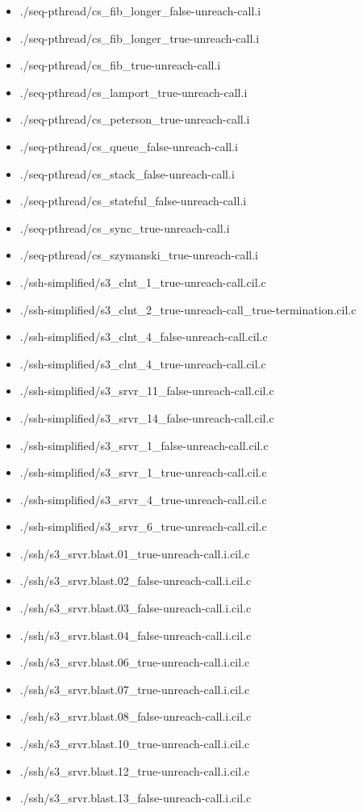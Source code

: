 \documentclass[envcountsame]{llncs}
\begin{document}
\begin{itemize}
\item ./seq-pthread/cs\_fib\_longer\_false-unreach-call.i
\item ./seq-pthread/cs\_fib\_longer\_true-unreach-call.i
\item ./seq-pthread/cs\_fib\_true-unreach-call.i
\item ./seq-pthread/cs\_lamport\_true-unreach-call.i
\item ./seq-pthread/cs\_peterson\_true-unreach-call.i
\item ./seq-pthread/cs\_queue\_false-unreach-call.i
\item ./seq-pthread/cs\_stack\_false-unreach-call.i
\item ./seq-pthread/cs\_stateful\_false-unreach-call.i
\item ./seq-pthread/cs\_sync\_true-unreach-call.i
\item ./seq-pthread/cs\_szymanski\_true-unreach-call.i


\item ./ssh-simplified/s3\_clnt\_1\_true-unreach-call.cil.c
\item ./ssh-simplified/s3\_clnt\_2\_true-unreach-call\_true-termination.cil.c
\item ./ssh-simplified/s3\_clnt\_4\_false-unreach-call.cil.c
\item ./ssh-simplified/s3\_clnt\_4\_true-unreach-call.cil.c
\item ./ssh-simplified/s3\_srvr\_11\_false-unreach-call.cil.c
\item ./ssh-simplified/s3\_srvr\_14\_false-unreach-call.cil.c
\item ./ssh-simplified/s3\_srvr\_1\_false-unreach-call.cil.c
\item ./ssh-simplified/s3\_srvr\_1\_true-unreach-call.cil.c
\item ./ssh-simplified/s3\_srvr\_4\_true-unreach-call.cil.c
\item ./ssh-simplified/s3\_srvr\_6\_true-unreach-call.cil.c


\item ./ssh/s3\_srvr.blast.01\_true-unreach-call.i.cil.c
\item ./ssh/s3\_srvr.blast.02\_false-unreach-call.i.cil.c
\item ./ssh/s3\_srvr.blast.03\_false-unreach-call.i.cil.c
\item ./ssh/s3\_srvr.blast.04\_false-unreach-call.i.cil.c
\item ./ssh/s3\_srvr.blast.06\_true-unreach-call.i.cil.c
\item ./ssh/s3\_srvr.blast.07\_true-unreach-call.i.cil.c
\item ./ssh/s3\_srvr.blast.08\_false-unreach-call.i.cil.c
\item ./ssh/s3\_srvr.blast.10\_true-unreach-call.i.cil.c
\item ./ssh/s3\_srvr.blast.12\_true-unreach-call.i.cil.c
\item ./ssh/s3\_srvr.blast.13\_false-unreach-call.i.cil.c



\end{itemize}
\end{document}
